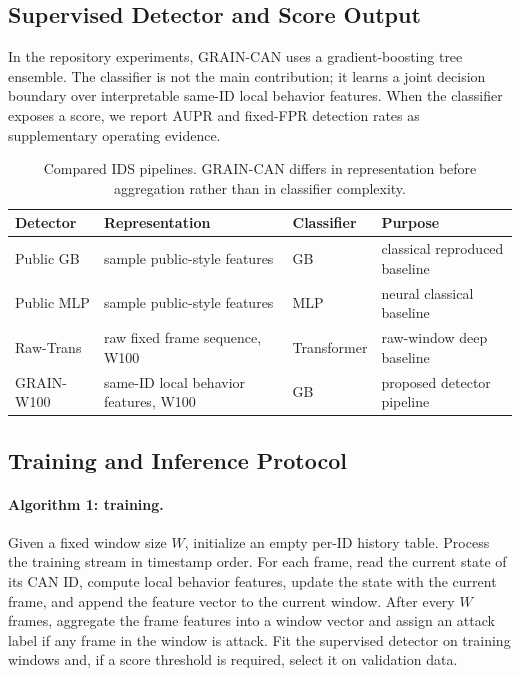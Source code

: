 \documentclass[runningheads]{llncs}
\newcommand{\method}{GRAIN-CAN}
\begin{document}
\subsection{Supervised Detector and Score Output}
In the repository experiments, \method{} uses a gradient-boosting tree ensemble. The classifier is not the main contribution; it learns a joint decision boundary over interpretable same-ID local behavior features. When the classifier exposes a score, we report AUPR and fixed-FPR detection rates as supplementary operating evidence.
\begin{table}[H]
\caption{Compared IDS pipelines. GRAIN-CAN differs in representation before aggregation rather than in classifier complexity.}\label{tab:pipelines}
\centering\small
\setlength{\tabcolsep}{3pt}
\begin{tabular}{>{\raggedright\arraybackslash}p{}>{\raggedright\arraybackslash}p{}>{\raggedright\arraybackslash}p{}>{\raggedright\arraybackslash}p{}}
\hline
Detector & Representation & Classifier & Purpose \\
\hline
Public GB & sample public-style features & GB & classical reproduced baseline \\
Public MLP & sample public-style features & MLP & neural classical baseline \\
Raw-Trans & raw fixed frame sequence, W100 & Transformer & raw-window deep baseline \\
GRAIN-W100 & same-ID local behavior features, W100 & GB & proposed detector pipeline \\
\hline
\end{tabular}
\end{table}

\subsection{Training and Inference Protocol}
\paragraph{Algorithm 1: training.}
Given a fixed window size \(W\), initialize an empty per-ID history table. Process the training stream in timestamp order. For each frame, read the current state of its CAN ID, compute local behavior features, update the state with the current frame, and append the feature vector to the current window. After every \(W\) frames, aggregate the frame features into a window vector and assign an attack label if any frame in the window is attack. Fit the supervised detector on training windows and, if a score threshold is required, select it on validation data.
\end{document}
